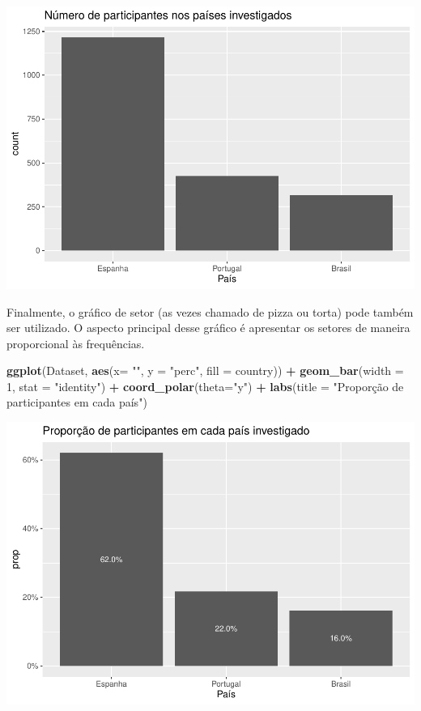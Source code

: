 \documentclass[
]{book}
\newenvironment{Shaded}{\begin{snugshade}}{\end{snugshade}}
\newcommand{\DataTypeTok}[1]{\textcolor[rgb]{0.13,0.29,0.53}{#1}}
\newcommand{\DecValTok}[1]{\textcolor[rgb]{0.00,0.00,0.81}{#1}}
\newcommand{\KeywordTok}[1]{\textcolor[rgb]{0.13,0.29,0.53}{\textbf{#1}}}
\newcommand{\NormalTok}[1]{#1}
\newcommand{\OperatorTok}[1]{\textcolor[rgb]{0.81,0.36,0.00}{\textbf{#1}}}
\newcommand{\StringTok}[1]{\textcolor[rgb]{0.31,0.60,0.02}{#1}}
\begin{document}
\includegraphics{gitbook-demo_files/figure-latex/unnamed-chunk-13-1.pdf}

Finalmente, o gráfico de setor (as vezes chamado de pizza ou torta) pode também ser utilizado. O aspecto principal desse gráfico é apresentar os setores de maneira proporcional às frequências.

\begin{Shaded}
\begin{Highlighting}[]
\KeywordTok{ggplot}\NormalTok{(Dataset, }\KeywordTok{aes}\NormalTok{(}\DataTypeTok{x=} \StringTok{""}\NormalTok{, }\DataTypeTok{y =} \StringTok{"perc"}\NormalTok{, }\DataTypeTok{fill =}\NormalTok{ country)) }\OperatorTok{+}
\StringTok{  }\KeywordTok{geom_bar}\NormalTok{(}\DataTypeTok{width =} \DecValTok{1}\NormalTok{, }\DataTypeTok{stat =} \StringTok{"identity"}\NormalTok{) }\OperatorTok{+}\StringTok{ }
\StringTok{  }\KeywordTok{coord_polar}\NormalTok{(}\DataTypeTok{theta=}\StringTok{"y"}\NormalTok{) }\OperatorTok{+}
\StringTok{  }\KeywordTok{labs}\NormalTok{(}\DataTypeTok{title =} \StringTok{"Proporção de participantes em cada país"}\NormalTok{)}
\end{Highlighting}
\end{Shaded}

\includegraphics{gitbook-demo_files/figure-latex/unnamed-chunk-14-1.pdf}
\end{document}
